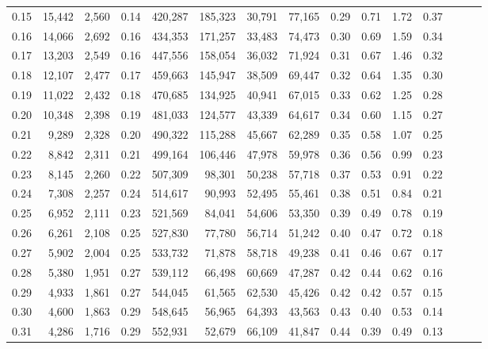 \begin{tabular}{rrrrrrrrrrrrrrr}
0.15 &  15,442 &  2,560 &  0.14 &  420,287 &  185,323 &   30,791 &   77,165 &  0.29 &  0.71 &  1.72 &      0.37 \\
0.16 &  14,066 &  2,692 &  0.16 &  434,353 &  171,257 &   33,483 &   74,473 &  0.30 &  0.69 &  1.59 &      0.34 \\
0.17 &  13,203 &  2,549 &  0.16 &  447,556 &  158,054 &   36,032 &   71,924 &  0.31 &  0.67 &  1.46 &      0.32 \\
0.18 &  12,107 &  2,477 &  0.17 &  459,663 &  145,947 &   38,509 &   69,447 &  0.32 &  0.64 &  1.35 &      0.30 \\
0.19 &  11,022 &  2,432 &  0.18 &  470,685 &  134,925 &   40,941 &   67,015 &  0.33 &  0.62 &  1.25 &      0.28 \\
0.20 &  10,348 &  2,398 &  0.19 &  481,033 &  124,577 &   43,339 &   64,617 &  0.34 &  0.60 &  1.15 &      0.27 \\
0.21 &   9,289 &  2,328 &  0.20 &  490,322 &  115,288 &   45,667 &   62,289 &  0.35 &  0.58 &  1.07 &      0.25 \\
0.22 &   8,842 &  2,311 &  0.21 &  499,164 &  106,446 &   47,978 &   59,978 &  0.36 &  0.56 &  0.99 &      0.23 \\
0.23 &   8,145 &  2,260 &  0.22 &  507,309 &   98,301 &   50,238 &   57,718 &  0.37 &  0.53 &  0.91 &      0.22 \\
0.24 &   7,308 &  2,257 &  0.24 &  514,617 &   90,993 &   52,495 &   55,461 &  0.38 &  0.51 &  0.84 &      0.21 \\
0.25 &   6,952 &  2,111 &  0.23 &  521,569 &   84,041 &   54,606 &   53,350 &  0.39 &  0.49 &  0.78 &      0.19 \\
0.26 &   6,261 &  2,108 &  0.25 &  527,830 &   77,780 &   56,714 &   51,242 &  0.40 &  0.47 &  0.72 &      0.18 \\
0.27 &   5,902 &  2,004 &  0.25 &  533,732 &   71,878 &   58,718 &   49,238 &  0.41 &  0.46 &  0.67 &      0.17 \\
0.28 &   5,380 &  1,951 &  0.27 &  539,112 &   66,498 &   60,669 &   47,287 &  0.42 &  0.44 &  0.62 &      0.16 \\
0.29 &   4,933 &  1,861 &  0.27 &  544,045 &   61,565 &   62,530 &   45,426 &  0.42 &  0.42 &  0.57 &      0.15 \\
0.30 &   4,600 &  1,863 &  0.29 &  548,645 &   56,965 &   64,393 &   43,563 &  0.43 &  0.40 &  0.53 &      0.14 \\
0.31 &   4,286 &  1,716 &  0.29 &  552,931 &   52,679 &   66,109 &   41,847 &  0.44 &  0.39 &  0.49 &      0.13 \\

\end{tabular}
